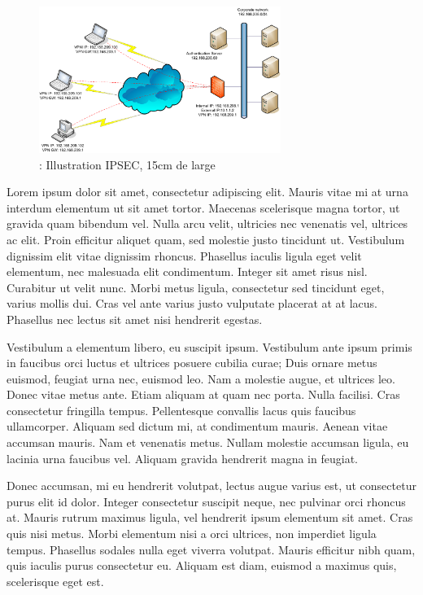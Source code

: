 \documentclass[a4paper,12pt]{report}
\begin{document}
\begin{figure}[H]
  \centering
  \includegraphics[width=0.7\textwidth]{image/images/illustrationssl}
  \caption{: Illustration IPSEC, 15cm de large}
\end{figure}
\begin{multicols}{3}
  	\setlength{\columnseprule}{1.5pt} %
	\setlength{\columnsep}{1cm} %
	\noindent
Lorem ipsum dolor sit amet, consectetur adipiscing elit. Mauris vitae mi at urna interdum elementum ut sit amet tortor. Maecenas scelerisque magna tortor, ut gravida quam bibendum vel. Nulla arcu velit, ultricies nec venenatis vel, ultrices ac elit. Proin efficitur aliquet quam, sed molestie justo tincidunt ut. Vestibulum dignissim elit vitae dignissim rhoncus. Phasellus iaculis ligula eget velit elementum, nec malesuada elit condimentum. Integer sit amet risus nisl. Curabitur ut velit nunc. Morbi metus ligula, consectetur sed tincidunt eget, varius mollis dui. Cras vel ante varius justo vulputate placerat at at lacus. Phasellus nec lectus sit amet nisi hendrerit egestas.

Vestibulum a elementum libero, eu suscipit ipsum. Vestibulum ante ipsum primis in faucibus orci luctus et ultrices posuere cubilia curae; Duis ornare metus euismod, feugiat urna nec, euismod leo. Nam a molestie augue, et ultrices leo. Donec vitae metus ante. Etiam aliquam at quam nec porta. Nulla facilisi. Cras consectetur fringilla tempus. Pellentesque convallis lacus quis faucibus ullamcorper. Aliquam sed dictum mi, at condimentum mauris. Aenean vitae accumsan mauris. Nam et venenatis metus. Nullam molestie accumsan ligula, eu lacinia urna faucibus vel. Aliquam gravida hendrerit magna in feugiat.

Donec accumsan, mi eu hendrerit volutpat, lectus augue varius est, ut consectetur purus elit id dolor. Integer consectetur suscipit neque, nec pulvinar orci rhoncus at. Mauris rutrum maximus ligula, vel hendrerit ipsum elementum sit amet. Cras quis nisi metus. Morbi elementum nisi a orci ultrices, non imperdiet ligula tempus. Phasellus sodales nulla eget viverra volutpat. Mauris efficitur nibh quam, quis iaculis purus consectetur eu. Aliquam est diam, euismod a maximus quis, scelerisque eget est.
\end{multicols}
\end{document}

